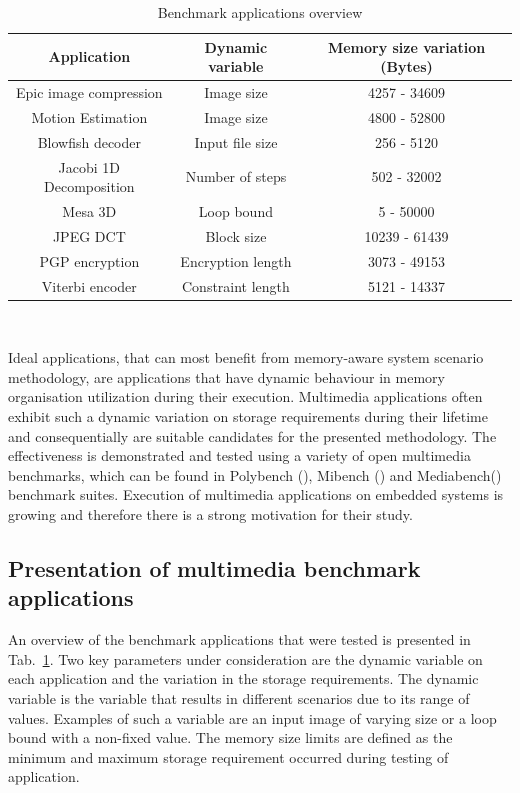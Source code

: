 \documentclass[a4paper,conference]{IEEEtran}
\begin{document}
\begin{center}
\begin{table}[!t]
\caption{Benchmark applications overview}
\label{tab:applications}
{\small
\hfill{}
\begin{tabular}{|c|c|c|}
\hline 
\textbf{Application} & \textbf{Dynamic variable} & \textbf{Memory size variation (Bytes)} \\ 
\hline 
Epic image compression & Image size & 4257 - 34609\\ 
\hline 
Motion Estimation & Image size & 4800 - 52800 \\ 
\hline 
Blowfish decoder & Input file size & 256 - 5120 \\ 
\hline 
Jacobi 1D Decomposition & Number of steps & 502 - 32002 \\ 
\hline 
Mesa 3D & Loop bound & 5 - 50000 \\ 
\hline 
JPEG DCT & Block size & 10239 - 61439 \\ 
\hline 
PGP encryption & Encryption length & 3073 - 49153 \\ 
\hline 
Viterbi encoder & Constraint length & 5121 - 14337 \\ 
\hline 
\end{tabular}}
\hfill{}
\\
\end{table}
\end{center}

Ideal applications, that can most benefit from memory-aware system scenario methodology, are applications that have dynamic behaviour in memory organisation utilization during their execution. Multimedia applications often exhibit such a dynamic variation on storage requirements during their lifetime and consequentially are suitable candidates for the presented methodology. The effectiveness is demonstrated and tested using a variety of open multimedia benchmarks, which can be found in Polybench (\cite{Poly}), Mibench (\cite{mibench}) and Mediabench(\cite{mediabench}) benchmark suites. Execution of multimedia applications on embedded systems is growing and therefore there is a strong motivation for their study.

\subsection{Presentation of multimedia benchmark applications}

An overview of the benchmark applications that were tested is presented in Tab.~\ref{tab:applications}. Two key parameters under consideration are the dynamic variable on each application and the variation in the storage requirements. The dynamic variable is the variable that results in different scenarios due to its range of values. Examples of such a variable are an input image of varying size or a loop bound with a non-fixed value. The memory size limits are defined as the minimum and maximum storage requirement occurred during testing of application.
\end{document}
